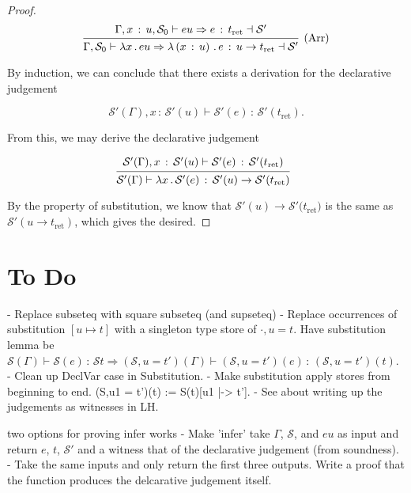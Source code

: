 \documentclass{article}
\newcommand{\G}{\Gamma}
\newcommand{\St}{\mathcal{S}}
\newcommand{\tp}{t}
\newcommand{\tret}{t_{\text{ret}}}
\newcommand{\uv}{u}
\newcommand{\eu}{eu}
\newcommand{\e}{e}
\newcommand{\x}{x}
\newcommand{\nil}{\cdot}
\renewcommand{\implies}{\Rightarrow}
\newcommand{\withtp}[2]{{#1} \,:\, {#2}}
\newcommand{\lam}[2]{\lambda {#1} \,.\, {#2}}
\newcommand{\lamtp}[3]{\lambda \left( {\withtp {#1} {#2}} \right) \,.\, {#3}}
\newcommand{\arr}[2]{{#1} \to {#2}}
\newcommand{\hastp}[3]{#1 \vdash {\withtp {#2} {#3}}}
\newcommand{\algtp}[6]{#1, #2 \vdash #3 \implies {\withtp {#4} {#5}} \dashv #6}
\newcommand{\deduct}[3][]
{
  \begin{prooftree}
    \hypo{#2}
    \infer1[\text{#1}]{#3}
  \end{prooftree}
}
\begin{document}
\begin{proof}
\[
  \deduct
  {
    \algtp {\G, \withtp \x {\uv}} {\St_0} \eu \e \tret {\St'}
  }
  {\algtp \G {\St_0} {\lam \x \eu} {\lamtp \x {\uv} \e} {\arr {\uv} {\tret}}
  {\St'}}
  {\text{(Arr)}}
\]

  By induction, we can conclude that there exists a derivation for the declarative judgement

  \[ \hastp {\St'(\G), \withtp \x {\St'(\uv)}} {\St'(\e)} {\St'(\tret)}.\]

  From this, we may derive the declarative judgement

  \[
    \deduct
    {\hastp {\St'(\G), \withtp \x {\St'(\uv)}} {\St'(\e)} {\St'(\tret)}}
    {\hastp {\St'(\G)} {\lam \x {\St'(\e)}} {\arr {\St'(\uv)} {\St'(\tret)}}}
  \]
  
  By the property of substitution, we know that \({\arr {\St'(\uv)}
  {\St'(\tret})}\) is the same as \(\St'(\arr {\uv} {\tret})\), which gives
  the desired.

\end{proof}

\section{To Do}

- Replace subseteq with square subseteq (and supseteq)
- Replace occurrences of substitution \([\uv \mapsto \tp]\) with a singleton
type store of \(\nil, \uv = \tp\). Have substitution lemma be \(\hastp {\St(\G)}
{\St(\e)} {\St{\tp}} \implies \hastp {(\St, \uv = \tp')(\G)} {(\St, \uv =
\tp')(\e)} {(\St, \uv = \tp')(\tp)}\).
- Clean up DeclVar case in Substitution.
- Make substitution apply stores from beginning to end. (S,u1 = t')(t) :=
S(t)[u1 |-> t'].
- See about writing up the judgements as witnesses in LH.

two options for proving infer works
- Make 'infer' take \(\Gamma\), \(\St\), and \(\eu\) as input and return \(\e\),
\(\tp\), \(\St'\) and a witness that of the declarative judgement (from
soundness).
- Take the same inputs and only return the first three outputs. Write a proof
that the function produces the delcarative judgement itself.
\end{document}
